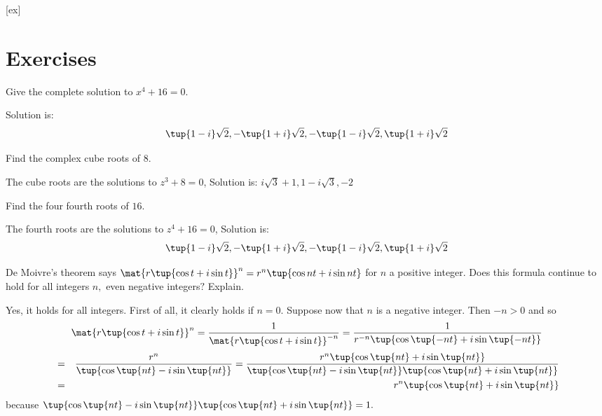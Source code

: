 [ex]
\section*{Exercises}

\begin{enumialphparenastyle}

\begin{ex} Give the complete solution to $x^{4}+16=0.$ 
\begin{sol}
 Solution is:
\[
\tup{1-i} \sqrt{2},-\tup{1+i} \sqrt{2},-\tup{1-i}
\sqrt{2},\tup{1+i} \sqrt{2}
\]
\end{sol}
\end{ex}

\begin{ex} \label{cuberoots} Find the complex cube roots of $8$.
\begin{sol}
The cube roots are the solutions to $%
z^{3}+8=0$, Solution is: $i\sqrt{3} +1,1-i\sqrt{3},-2$
\end{sol}
\end{ex}

\begin{ex} \label{cuberoots2} Find the four fourth roots of $16$.  
\begin{sol}
The fourth roots are
the solutions to $z^{4}+16=0$, Solution is:
\[
\tup{1-i} \sqrt{2},-\tup{1+i} \sqrt{2},-\tup{1-i}
\sqrt{2},\tup{1+i}\sqrt{2}
\]
\end{sol}
\end{ex}

\begin{ex} \label{exercomplex1}De Moivre's theorem says $\mat{r\tup{\cos
t+i\sin t}} ^{n}=r^{n}\tup{\cos nt+i\sin nt} $ for $n$
a positive integer. Does this formula continue to hold for all integers $n,$
even negative integers$?$ Explain.  
\begin{sol}
Yes, it holds for all integers. First of
all, it clearly holds if $n=0$. Suppose now that $n$ is a negative integer.
Then $-n>0$ and so
\[
\mat{r\tup{\cos t+i\sin t}} ^{n}=\frac{1}{\mat{r\tup{
\cos t+i\sin t}} ^{-n}}=\frac{1}{r^{-n}\tup{\cos \tup{
-nt} +i\sin \tup{-nt} } }
\]
\begin{eqnarray*}
&=&\frac{r^{n}}{\tup{\cos \tup{nt} -i\sin \tup{nt} }
}=\frac{r^{n}\tup{\cos \tup{nt} +i\sin \tup{nt} } }{
\tup{\cos \tup{nt} -i\sin \tup{nt} } \tup{\cos
\tup{nt} +i\sin \tup{nt} } } \\
&=&r^{n}\tup{\cos \tup{nt} +i\sin \tup{nt} }
\end{eqnarray*}
because $\tup{\cos \tup{nt} -i\sin \tup{nt} } \tup{
\cos \tup{nt} +i\sin \tup{nt} } =1.$
\end{sol}
\end{ex}


\end{enumialphparenastyle}
